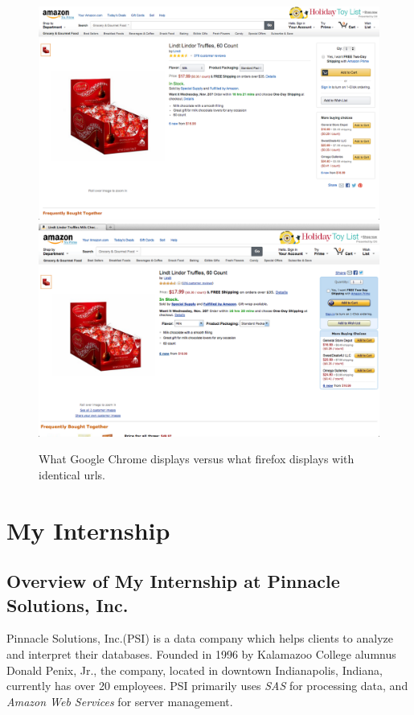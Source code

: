 \documentclass[12pt]{report}
\begin{document}
\begin{figure}[htp]
\includegraphics[width=\textwidth]{lindt_chrome.png}
\includegraphics[width=\textwidth]{lindt_firefox.png}
\caption[Comparison of same url in different browsers]
{What Google Chrome displays versus what firefox displays with identical urls.}
\end{figure}

\chapter{My Internship}
\section{Overview of My Internship at Pinnacle Solutions, Inc.}
Pinnacle Solutions, Inc.(PSI) is a data company which helps clients to analyze and interpret their databases. Founded in 1996 by Kalamazoo College alumnus Donald Penix, Jr., the company, located in downtown Indianapolis, Indiana, currently has over 20 employees. PSI primarily uses \textit{SAS} for processing data, and \textit{Amazon Web Services} for server management.
\end{document}
